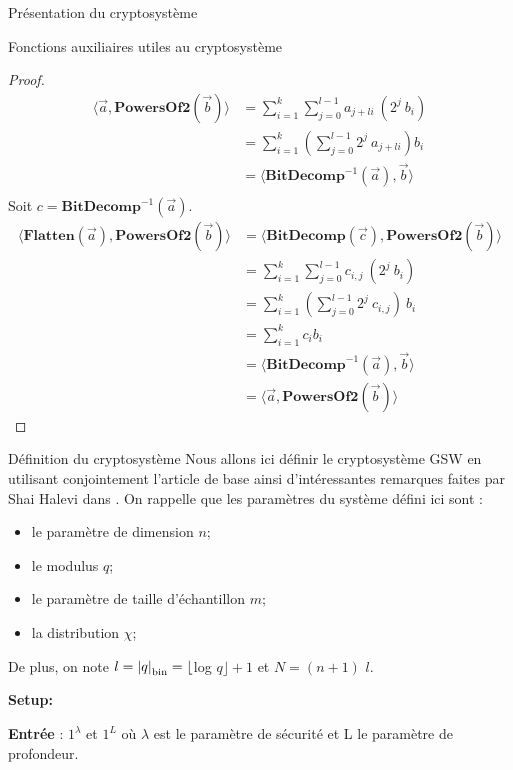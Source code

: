 \begin{section}{Présentation du cryptosystème}
\begin{subsection}{Fonctions auxiliaires utiles au cryptosystème}
	\begin{proof}
	\begin{align*}
	\langle \vec{a}, \textbf{PowersOf2}(\vec{b}) \rangle &= \sum\limits_{i=1}^{k} \sum\limits_{j=0}^{l-1} a_{j+li}
	\: (2^{j} \: b_i) \\
	&= \sum\limits_{i=1}^{k} \left(\sum\limits_{j=0}^{l-1} 2^j\: a_{j+li} \right) b_i \\
	&= \langle \textbf{BitDecomp}^{-1}(\vec{a}), \vec{b}\rangle \\
	\end{align*}
	Soit $c = \textbf{BitDecomp}^{-1}(\vec{a})$.
	\begin{align*}
	\langle \textbf{Flatten}(\vec{a}),\textbf{PowersOf2}(\vec{b}) \rangle &= \langle \textbf{BitDecomp}(\vec{c}),\textbf{PowersOf2}(\vec{b}) \rangle \\
	&= \sum\limits_{i=1}^{k} \sum\limits_{j=0}^{l-1} c_{i,j}\: (2^{j}\: b_i) \\
	&= \sum\limits_{i=1}^{k} \left(\sum\limits_{j=0}^{l-1} 2^j \: c_{i,j}\right)\: b_i \\
	&= \sum\limits_{i=1}^{k}  c_i b_i \\
	&= \langle \textbf{BitDecomp}^{-1}(\vec{a}), \vec{b}\rangle \\
	&= \langle \vec{a}, \textbf{PowersOf2}(\vec{b}) \rangle
	\end{align*}
	\end{proof}
	
	\end{subsection}
	\begin{subsection}{Définition du cryptosystème}
	Nous allons ici définir le cryptosystème GSW en utilisant conjointement l'article de base
	\cite{EPRINT:GenSahWat13} ainsi d'intéressantes remarques faites par Shai Halevi dans \cite{halevi}.
	On rappelle que les paramètres du système défini ici sont : 
\begin{itemize}
\item le paramètre de dimension $n$;
\item le modulus $q$;
\item le paramètre de taille d'échantillon $m$;
\item la distribution $\chi$;
\end{itemize}
De plus, on note $l = {|q|}_{\text{bin}} = \lfloor$log $q\rfloor + 1$ et $N = (n + 1)$ $l$.


\vspace{0.5cm}\noindent\textbf{Setup:}

	\flushleft

	\textbf{Entrée} : $1^\lambda$ et $1^L$ où $\lambda$ est le paramètre de sécurité et L le paramètre de profondeur.


\end{subsection}
\end{section}
